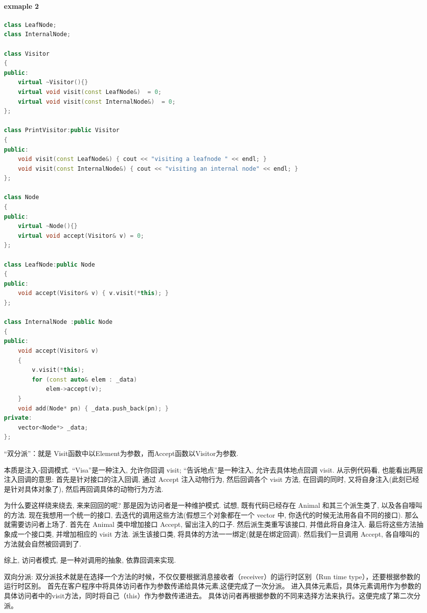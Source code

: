 \documentclass{book}
\begin{document}
\paragraph{exmaple 2}\mbox{}
\begin{lstlisting}[caption={visitor pattern sample code 2},language=C++]
class LeafNode;
class InternalNode;

class Visitor
{
public:
    virtual ~Visitor(){}
    virtual void visit(const LeafNode&)  = 0;
    virtual void visit(const InternalNode&)  = 0;
};

class PrintVisitor:public Visitor
{
public:
    void visit(const LeafNode&) { cout << "visiting a leafnode " << endl; }
    void visit(const InternalNode&) { cout << "visiting an internal node" << endl; }
};

class Node
{
public:
    virtual ~Node(){}
    virtual void accept(Visitor& v) = 0;
};

class LeafNode:public Node
{
public:
    void accept(Visitor& v) { v.visit(*this); }
};

class InternalNode :public Node
{
public:
    void accept(Visitor& v)
    {
        v.visit(*this);
        for (const auto& elem : _data)
            elem->accept(v);
    }
    void add(Node* pn) { _data.push_back(pn); }
private:
    vector<Node*> _data;
};
\end{lstlisting}

\begin{CJK}{UTF8}{gbsn}
“双分派”：就是 Visit函数中以Element为参数，而Accept函数以Visitor为参数.

  本质是注入-回调模式. ``Visa''是一种注入, 允许你回调 visit; ``告诉地点''是一种注入, 允许去具体地点回调 visit.
  从示例代码看, 也能看出两层注入回调的意思: 首先是针对接口的注入回调, 通过 Accept 注入动物行为, 然后回调各个 visit 方法, 在回调的同时, 又将自身注入(此刻已经是针对具体对象了), 然后再回调具体的动物行为方法.

  为什么要这样绕来绕去, 来来回回的呢?
  那是因为访问者是一种维护模式. 试想, 既有代码已经存在 Animal 和其三个派生类了, 以及各自嚎叫的方法.
  现在我想用一个统一的接口, 去迭代的调用这些方法(假想三个对象都在一个 vector 中, 你迭代的时候无法用各自不同的接口). 那么就需要访问者上场了. 
  首先在 Animal 类中增加接口 Accept, 留出注入的口子. 然后派生类重写该接口, 并借此将自身注入. 
  最后将这些方法抽象成一个接口类, 并增加相应的 visit 方法. 派生该接口类, 将具体的方法一一绑定(就是在绑定回调). 然后我们一旦调用 Accept, 各自嚎叫的方法就会自然被回调到了.

  综上, 访问者模式, 是一种对调用的抽象, 依靠回调来实现.

双向分派:
双分派技术就是在选择一个方法的时候，不仅仅要根据消息接收者（receiver）的运行时区别（Run time type），还要根据参数的运行时区别。
首先在客户程序中将具体访问者作为参数传递给具体元素,这便完成了一次分派。
进入具体元素后，具体元素调用作为参数的具体访问者中的visit方法，同时将自己（this）作为参数传递进去。
    具体访问者再根据参数的不同来选择方法来执行。这便完成了第二次分派。

\end{CJK}
\end{document}
